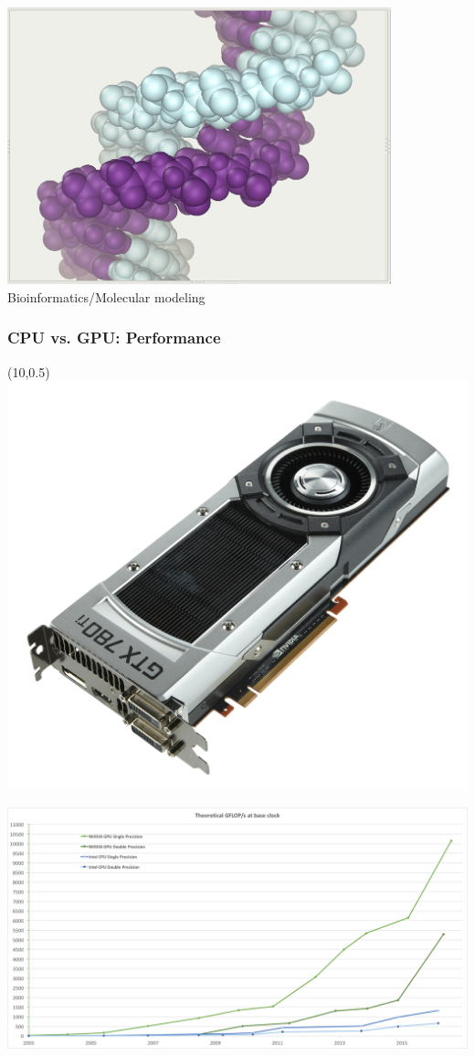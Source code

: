 \documentclass{beamer}
\begin{document}
\begin{frame}
\begin{textblock}{6}
\includegraphics[width=0.8333\textwidth]{graphics/molecularmodeling}
\\
 Bioinformatics/Molecular modeling
\end{textblock}
\end{frame}


\begin{frame}[fragile]
  \frametitle{CPU vs. GPU: Performance}

  \begin{textblock}{5}(10,0.5)
  \centering
  \includegraphics[width=\textwidth]{graphics/geforce-gtx-780-ti}
\end{textblock}
\includegraphics[width=\textwidth]{graphics/cpu-vs-gpu-flops}
\end{frame}
\end{document}
